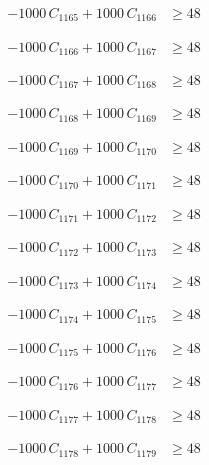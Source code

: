\documentclass[a4paper,11pt]{article}
\begin{document}
\begin{align}
-1000\,C_{1165} + 1000\,C_{1166} &\geq 48 \nonumber
\end{align}

\begin{align}
-1000\,C_{1166} + 1000\,C_{1167} &\geq 48 \nonumber
\end{align}

\begin{align}
-1000\,C_{1167} + 1000\,C_{1168} &\geq 48 \nonumber
\end{align}

\begin{align}
-1000\,C_{1168} + 1000\,C_{1169} &\geq 48 \nonumber
\end{align}

\begin{align}
-1000\,C_{1169} + 1000\,C_{1170} &\geq 48 \nonumber
\end{align}

\begin{align}
-1000\,C_{1170} + 1000\,C_{1171} &\geq 48 \nonumber
\end{align}

\begin{align}
-1000\,C_{1171} + 1000\,C_{1172} &\geq 48 \nonumber
\end{align}

\begin{align}
-1000\,C_{1172} + 1000\,C_{1173} &\geq 48 \nonumber
\end{align}

\begin{align}
-1000\,C_{1173} + 1000\,C_{1174} &\geq 48 \nonumber
\end{align}

\begin{align}
-1000\,C_{1174} + 1000\,C_{1175} &\geq 48 \nonumber
\end{align}

\begin{align}
-1000\,C_{1175} + 1000\,C_{1176} &\geq 48 \nonumber
\end{align}

\begin{align}
-1000\,C_{1176} + 1000\,C_{1177} &\geq 48 \nonumber
\end{align}

\begin{align}
-1000\,C_{1177} + 1000\,C_{1178} &\geq 48 \nonumber
\end{align}

\begin{align}
-1000\,C_{1178} + 1000\,C_{1179} &\geq 48 \nonumber
\end{align}
\end{document}
